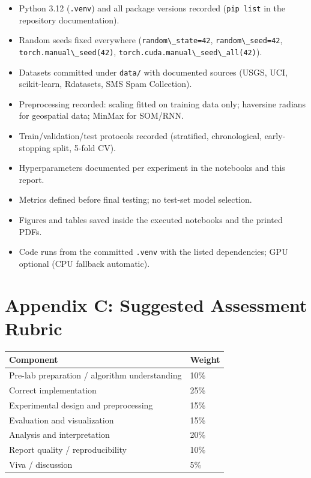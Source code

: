\begin{itemize}
\tightlist
\item
  Python 3.12 (\passthrough{\lstinline!.venv!}) and all package versions
  recorded (\passthrough{\lstinline!pip list!} in the repository
  documentation).
\item
  Random seeds fixed everywhere
  (\passthrough{\lstinline!random\_state=42!},
  \passthrough{\lstinline!random\_seed=42!},
  \passthrough{\lstinline!torch.manual\_seed(42)!},
  \passthrough{\lstinline!torch.cuda.manual\_seed\_all(42)!}).
\item
  Datasets committed under \passthrough{\lstinline!data/!} with
  documented sources (USGS, UCI, scikit-learn, Rdatasets, SMS Spam
  Collection).
\item
  Preprocessing recorded: scaling fitted on training data only;
  haversine radians for geospatial data; MinMax for SOM/RNN.
\item
  Train/validation/test protocols recorded (stratified, chronological,
  early-stopping split, 5-fold CV).
\item
  Hyperparameters documented per experiment in the notebooks and this
  report.
\item
  Metrics defined before final testing; no test-set model selection.
\item
  Figures and tables saved inside the executed notebooks and the printed
  PDFs.
\item
  Code runs from the committed \passthrough{\lstinline!.venv!} with the
  listed dependencies; GPU optional (CPU fallback automatic).
\end{itemize}

\chapter{Appendix C: Suggested Assessment
Rubric}\label{appendix-c-suggested-assessment-rubric}

{\def\LTcaptype{none} %
\begin{longtable}[]{@{}ll@{}}
\toprule\noalign{}
Component & Weight \\
\midrule\noalign{}
\endhead
\bottomrule\noalign{}
\endlastfoot
Pre-lab preparation / algorithm understanding & 10\% \\
Correct implementation & 25\% \\
Experimental design and preprocessing & 15\% \\
Evaluation and visualization & 15\% \\
Analysis and interpretation & 20\% \\
Report quality / reproducibility & 10\% \\
Viva / discussion & 5\% \\
\end{longtable}
}

